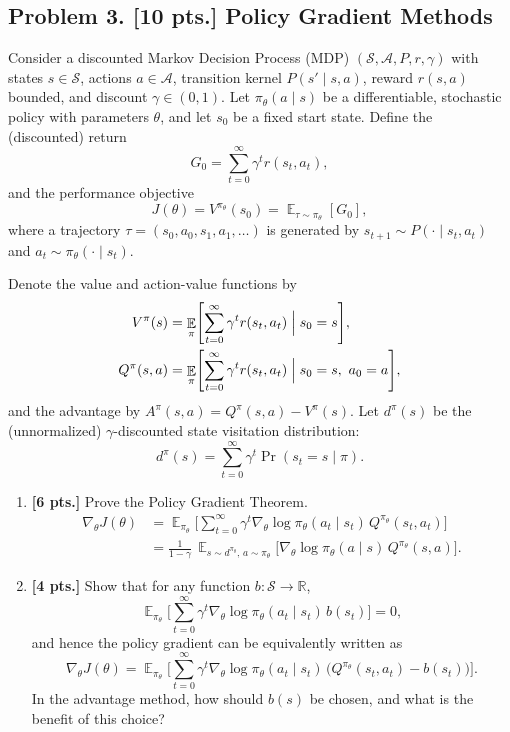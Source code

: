 \documentclass[11pt,a4paper]{article}
\DeclareMathOperator{\E}{\mathbb{E}}
\begin{document}
\subsection{Problem 3. [10 pts.] Policy Gradient Methods}
Consider a discounted Markov Decision Process (MDP) $(\mathcal{S}, \mathcal{A}, P, r, \gamma)$ with states $s \in \mathcal{S}$, actions $a \in \mathcal{A}$, transition kernel $P(s' \mid s, a)$, reward $r(s, a)$ bounded, and discount $\gamma \in (0, 1)$. Let $\pi_{\theta}(a \mid s)$ be a differentiable, stochastic policy with parameters $\theta$, and let $s_0$ be a fixed start state. Define the (discounted) return
\[
G_0 = \sum_{t=0}^{\infty} \gamma^{t} r(s_t, a_t),
\]
and the performance objective
\[
J(\theta) = V^{\pi_{\theta}}(s_0) = \E_{\tau \sim \pi_{\theta}}[G_0],
\]
where a trajectory $\tau = (s_0, a_0, s_1, a_1, \dots)$ is generated by $s_{t+1} \sim P(\cdot \mid s_t, a_t)$ and $a_t \sim \pi_{\theta}(\cdot \mid s_t)$.

Denote the value and action-value functions by
\begin{align*}
V^{\pi}(s)
&= \E_{\pi}\Biggl[ \sum_{t=0}^{\infty} \gamma^{t} r(s_t, a_t) \Bigm| s_0 = s \Biggr], \\
Q^{\pi}(s, a)
&= \E_{\pi}\Biggl[ \sum_{t=0}^{\infty} \gamma^{t} r(s_t, a_t) \Bigm| s_0 = s,\ a_0 = a \Biggr],
\end{align*}
and the advantage by $A^{\pi}(s, a) = Q^{\pi}(s, a) - V^{\pi}(s)$. Let $d^{\pi}(s)$ be the (unnormalized) $\gamma$-discounted state visitation distribution:
\[
d^{\pi}(s) = \sum_{t=0}^{\infty} \gamma^{t} \Pr(s_t = s \mid \pi).
\]
\begin{enumerate}[label=(\alph*)]
    \item \textbf{[6 pts.]} Prove the Policy Gradient Theorem.
    \begin{align*}
    \nabla_{\theta} J(\theta)
    &= \E_{\pi_{\theta}}\Biggl[ \sum_{t=0}^{\infty} \gamma^{t} \nabla_{\theta} \log \pi_{\theta}(a_t \mid s_t)\, Q^{\pi_{\theta}}(s_t, a_t) \Biggr] \\
    &= \frac{1}{1 - \gamma}\, \E_{s \sim d^{\pi_{\theta}},\, a \sim \pi_{\theta}}\bigl[ \nabla_{\theta} \log \pi_{\theta}(a \mid s)\, Q^{\pi_{\theta}}(s, a) \bigr].
    \end{align*}
    \item \textbf{[4 pts.]} Show that for any function $b : \mathcal{S} \to \mathbb{R}$,
    \[
    \E_{\pi_{\theta}}\Biggl[ \sum_{t=0}^{\infty} \gamma^{t} \nabla_{\theta} \log \pi_{\theta}(a_t \mid s_t)\, b(s_t) \Biggr] = 0,
    \]
    and hence the policy gradient can be equivalently written as
    \[
    \nabla_{\theta} J(\theta)
    = \E_{\pi_{\theta}}\Biggl[ \sum_{t=0}^{\infty} \gamma^{t} \nabla_{\theta} \log \pi_{\theta}(a_t \mid s_t)\, \bigl(Q^{\pi_{\theta}}(s_t, a_t) - b(s_t)\bigr) \Biggr].
    \]
    In the advantage method, how should $b(s)$ be chosen, and what is the benefit of this choice?
\end{enumerate}
\end{document}
